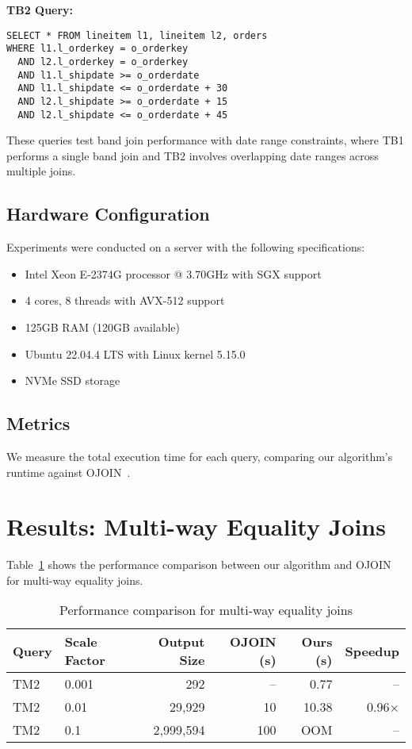 \textbf{TB2 Query:}
\begin{verbatim}
SELECT * FROM lineitem l1, lineitem l2, orders
WHERE l1.l_orderkey = o_orderkey
  AND l2.l_orderkey = o_orderkey
  AND l1.l_shipdate >= o_orderdate
  AND l1.l_shipdate <= o_orderdate + 30
  AND l2.l_shipdate >= o_orderdate + 15
  AND l2.l_shipdate <= o_orderdate + 45
\end{verbatim}

These queries test band join performance with date range constraints, where TB1 performs a single band join and TB2 involves overlapping date ranges across multiple joins.

\subsection{Hardware Configuration}

Experiments were conducted on a server with the following specifications:
\begin{itemize}
\item Intel Xeon E-2374G processor @ 3.70GHz with SGX support
\item 4 cores, 8 threads with AVX-512 support
\item 125GB RAM (120GB available)
\item Ubuntu 22.04.4 LTS with Linux kernel 5.15.0
\item NVMe SSD storage
\end{itemize}

\subsection{Metrics}

We measure the total execution time for each query, comparing our algorithm's runtime against OJOIN~\cite{hu2025optimal}.

\section{Results: Multi-way Equality Joins}

Table~\ref{tab:equality-joins} shows the performance comparison between our algorithm and OJOIN~\cite{hu2025optimal} for multi-way equality joins.

\begin{table}[h]
\centering
\caption{Performance comparison for multi-way equality joins}
\label{tab:equality-joins}
\begin{tabular}{llrrrr}
\toprule
Query & Scale Factor & Output Size & OJOIN (s) & Ours (s) & Speedup \\
\midrule
TM2 & 0.001 & 292 & -- & 0.77 & -- \\
TM2 & 0.01 & 29,929 & 10 & 10.38 & 0.96× \\
TM2 & 0.1 & 2,999,594 & 100 & OOM\footnotemark & -- \\
\bottomrule
\end{tabular}
\end{table}

